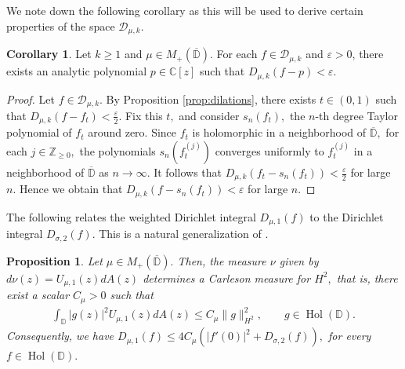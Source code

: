 \documentclass[10pt,oneside,reqno]{amsart}
\newtheorem{proposition}[theorem]{Proposition}
\theoremstyle{definition}
\newtheorem{corollary}[theorem]{Corollary}
\theoremstyle{remark}
\renewcommand{\ge}{\geqslant}
\newcommand{\D}{\mathbb D}
\numberwithin{equation}{section}
\begin{document}
We note down the following corollary as this will be used to derive certain properties of the space $\mathscr D_{\mu, k}.$
 
\begin{corollary}
    Let $k\ge 1$ and $\mu\in M_+(\overline{\D}).$  For each $f\in \mathscr D_{\mu,k}$ and $\varepsilon >0 $, there exists an analytic polynomial $p\in\mathbb C[z]$ such that $D_{\mu, k} (f - p) < \varepsilon$.
    \label{cor:density-of-poly}
\end{corollary}
\begin{proof}
Let $f\in \mathscr D_{\mu,k}.$ By Proposition \ref{prop:dilations}, there exists $t\in (0,1)$ such that  $D_{\mu, k} (f - f_t) < \frac{\varepsilon}{2}.$ Fix this $t,$ and consider $s_n(f_t),$ the $n$-th degree Taylor polynomial of $f_t$ around zero. Since $f_t$ is holomorphic in a neighborhood of $\overline{\D},$ for each $j\in \mathbb Z_{\geqslant 0},$ the polynomials $s_n(f_t^{(j)})$ converges uniformly to $f_t^{(j)}$ in a neighborhood of $\overline{\D}$ as $n\to \infty.$ It follows that $D_{\mu, k} (f_t - s_n(f_t)) < \frac{\varepsilon}{2}$ for large $n.$ Hence we obtain that $D_{\mu, k} (f - s_n(f_t)) < \varepsilon$ for large $n.$
\end{proof}

The following relates the weighted Dirichlet integral $D_{\mu,1}(f)$ to the Dirichlet integral $D_{\sigma,2}(f)$. This is a natural generalization of \cite[Proposition 5.3]{Rydhe19}.

\begin{proposition} \label{Carleson measure}
    Let  $\mu\in M_+(\overline{\D}).$ Then, the measure $\nu$ given by $d\nu (z) = U_{\mu,1} (z)dA(z)$ determines a Carleson measure for $H^2,$ that is, there exist a scalar $C_{\mu}>0$ such that
    \begin{align*}
        \int_{\D}|g(z)|^2 U_{\mu,1} (z)dA(z) \leqslant C_{\mu} \|g\|_{H^2}^2,\qquad g\in\operatorname{Hol}(\D).
    \end{align*}
    Consequently, we have $D_{\mu,1}(f) \leqslant 4C_{\mu} \left(|f'(0)|^2 + D_{\sigma,2}(f)\right),$ for every $f\in\operatorname{Hol}(\D).$
\end{proposition}
\end{document}
